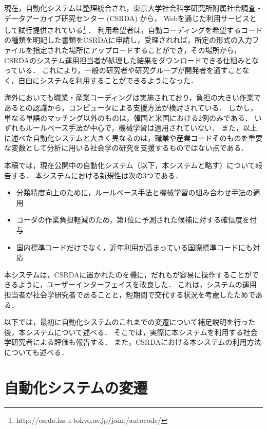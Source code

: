 \documentclass[japanese]{jnlp_1.4}
\begin{document}
現在，自動化システムは整理統合され，東京大学社会科学研究所附属社会調査・データアーカイブ研究センター (CSRDA) から， Webを通じた利用サービスとして試行提供されている\footnote{http://csrda.iss.u-tokyo.ac.jp/joint/autocode/} \cite{Takahashi_et_al14}．
利用希望者は，自動コーディングを希望するコードの種類を明記した書類をCSRDAに申請し，受理されれば，所定の形式の入力ファイルを指定された場所にアップロードすることができ，その場所から，CSRDAのシステム運用担当者が処理した結果をダウンロードできる仕組みとなっている．
これにより，一般の研究者や研究グループが開発者を通すことなく，自由にシステムを利用することができるようになった．

海外においても職業・産業コーディングは実施されており，負担の大きい作業であるとの認識から，コンピュータによる支援方法が検討されている．
しかし，単なる単語のマッチング以外のものは，韓国と米国における2例のみである．
いずれもルールベース手法が中心で，機械学習は適用されていない． 
また，以上に述べた自動化システムと大きく異なるのは，職業や産業コードそのものを重要な変数として分析に用いる社会学の研究を支援するものではない点である．

本稿では，現在公開中の自動化システム（以下，本システムと略す）について報告する．
本システムにおける新規性は次の3つである．

\begin{itemize}
 \item 分類精度向上のために，ルールベース手法と機械学習の組み合わせ手法の適用
 \item コーダの作業負担軽減のため，第1位に予測された候補に対する確信度を付与
 \item 国内標準コードだけでなく，近年利用が高まっている国際標準コードにも対応
\end{itemize}

本システムは，CSRDAに置かれたのを機に，だれもが容易に操作することができるように，ユーザーインターフェイスを改良した．
これは，システムの運用担当者が社会学研究者であることと，短期間で交代する状況を考慮したためである．

以下では，最初に自動化システムのこれまでの変遷について補足説明を行った後，本システムについて述べる．
そこでは，実際に本システムを利用する社会学研究者による評価も報告する．
また，CSRDAにおける本システムの利用方法についても述べる． 


\section{自動化システムの変遷}
\end{document}
